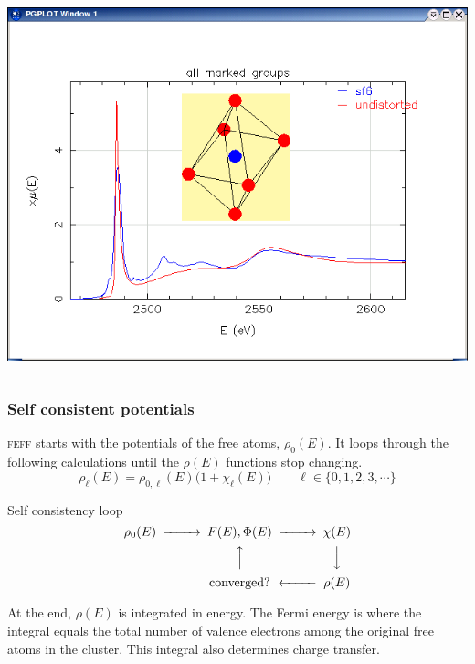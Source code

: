 \begin{frame}
\begin{columns}
\begin{column}{6cm}
      \medskip

      \centering\includegraphics[width=0.86\linewidth]{images/SF6/sf6_undistorted}
    \end{column}
  \end{columns}
\end{frame}

\begin{frame}
  \frametitle{Self consistent potentials}

  \textsc{feff} starts with the potentials of the free atoms,
  $\rho_0(E)$.  It loops through the following calculations until
  the $\rho(E)$ functions stop changing.
  {\color{Blue4}
    \begin{equation*}
      \rho_\ell(E) = \rho_{0,\ell}(E)  \big(1 + \chi_\ell(E)\big)
      \qquad \ell \in \{0, 1, 2, 3, \cdots\}
    \end{equation*}
    }

  \begin{block}{Self consistency loop}
    \begin{equation*}
      \begin{CD}
        \rho_0(E) @>>> F(E),\Phi(E) @>>> \chi(E) \\
        && @AAA @VVV \\
        && \mathrm{converged?} @<<< \rho(E)
      \end{CD}
    \end{equation*}
  \end{block}

  \begin{center}
    At the end, $\rho(E)$ is integrated in energy.  The Fermi energy
    is where the integral equals the total number of valence electrons
    among the original free atoms in the cluster.  This integral also
    determines charge transfer.
  \end{center}
\end{frame}

